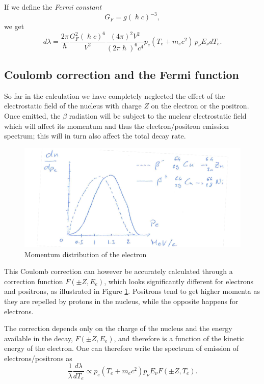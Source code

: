 If we define the \emph{Fermi constant}
\begin{equation*}
\label{eq:GF}
    G_F = g(\hslash c)^{-3},
\end{equation*}
we get
\begin{equation*}
    d\lambda = \frac{2\pi}{\hslash} \frac{G_F^2(\hslash c)^6}{V^2}\frac{(4\pi)^2V^2}{(2\pi\hslash)^6c^4} p_e (T_e + m_e c^2) \,
    p_\nu E_\nu dT_e.
\end{equation*}

\subsection{Coulomb correction and the Fermi function}

So far in the calculation we have completely neglected the effect of the electrostatic field of the nucleus with charge $Z$ on the electron or the positron. Once emitted, the $\beta$ radiation will be subject to the nuclear electrostatic field which will affect its momentum and thus the electron/positron emission spectrum; this will in turn also affect the total decay rate.

\begin{figure}[h]
    \includegraphics[scale=0.5]{Figures/nuclear-physics-fig20}
    \caption{Momentum distribution of the electron}
    \label{nuclear-physics-fig:20}
\end{figure}

This Coulomb correction can however be accurately calculated through a correction function $F(\pm Z, E_e)$, which looks significantly different for electrons and positrons, as illustrated in Figure \ref{nuclear-physics-fig:20}. Positrons tend to get higher momenta as they are repelled by protons in the nucleus, while the opposite happens for electrons.

The correction depends only on the charge of the nucleus and the energy available in the decay, $F(\pm Z, E_e)$, and therefore is a function of the kinetic energy of the electron.
One can therefore write the spectrum of emission of electrons/positrons as
\begin{equation*}
    \frac{1}{\lambda} \frac{d\lambda}{dT_e} \propto p_e (T_e+m_ec^2) p_\nu E_\nu F(\pm Z, T_e).
\end{equation*}

